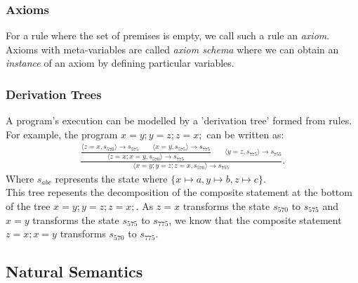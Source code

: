\documentclass[a4paper, 12pt, twoside]{article}
\begin{document}
\subsubsection{Axioms}

For a rule where the set of premises is empty, we call 
such a rule an \textit{axiom}. Axioms with meta-variables
are called \textit{axiom schema} where we can obtain an
\textit{instance} of an axiom by defining particular
variables.

\subsubsection{Derivation Trees}

A program's execution can be modelled by a 'derivation tree'
formed from rules.
For example, the program $x=y;y=z;z=x;$ can be written as:
\begin{gather*}
  \frac{\dfrac{
    \langle z=x, s_{570} \rangle \to s_{575} 
    \qquad \langle x=y, s_{575} \rangle \to s_{775}
  }{\langle z=x;x=y, s_{570} \rangle \to s_{775}}
  \qquad \langle y=z, s_{775} \rangle \to s_{755}}
  {\langle x=y;y=z;z=x, s_{570} \rangle \to s_{755}}.
\end{gather*} Where $s_{abc}$ represents the state where 
$\{x \mapsto a, y \mapsto b, z \mapsto c\}$.
\\[\baselineskip]
This tree repesents the decomposition of the composite statement
at the bottom of the tree $x=y;y=z;z=x;$. As $z=x$ transforms
the state $s_{570}$ to $s_{575}$ and $x=y$ transforms the state
$s_{575}$ to $s_{775}$, we know that the composite statement
$z=x;x=y$ transforms $s_{570}$ to $s_{775}$.

\newpage

\subsection{Natural Semantics}
\end{document}
